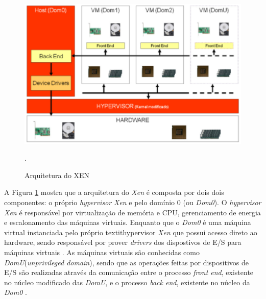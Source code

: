 \begin{figure}[h!]
\centering
\includegraphics [keepaspectratio=true,scale=0.65]{figuras/xen_arquitecture.eps}
\caption{Arquitetura do XEN}
\cite{fabiano}.
\label{xen_arquitecture}
\end{figure}

A Figura \ref{xen_arquitecture} mostra que a arquitetura do \textit{Xen} é composta por dois dois componentes: o próprio \textit{hypervisor} \textit{Xen} e pelo domínio 0 (ou \textit{Dom0}). O \textit{hypervisor} \textit{Xen} é responsável por virtualização de memória e CPU, gerenciamento de energia e escalonamento das máquinas virtuais. Enquanto que o \textit{Dom0} é uma máquina virtual instanciada pelo próprio textit{hypervisor} \textit{Xen} que possui acesso direto ao hardware, sendo responsável por prover \textit{drivers} dos dispostivos de E/S para máquinas virtuais \cite{redhatkvm}. As máquinas virtuais são conhecidas como \textit{DomU}(\textit{unprivileged domain}), sendo que as operações feitas por dispositivos de E/S são realizadas através da comunicação entre o processo \textit{front end}, existente no núcleo modificado das \textit{DomU}, e o processo \textit{back end}, existente no núcleo da \textit{Dom0} \cite{redhatkvm}.



